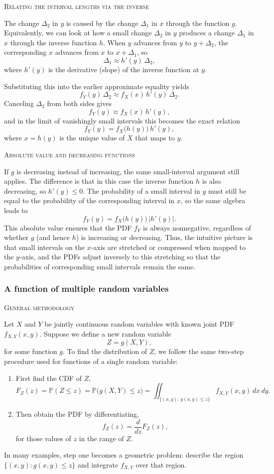 \textsc{Relating the interval lengths via the inverse}

The change \(\Delta_2\) in \(y\) is caused by the change \(\Delta_1\) in \(x\) through the function \(g\).  
Equivalently, we can look at how a small change \(\Delta_2\) in \(y\) produces a change \(\Delta_1\) in \(x\) through the inverse function \(h\).  
When \(y\) advances from \(y\) to \(y + \Delta_2\), the corresponding \(x\) advances from \(x\) to \(x + \Delta_1\), so
\[
\Delta_1
\approx
h'(y)\,\Delta_2,
\]
where \(h'(y)\) is the derivative (slope) of the inverse function at \(y\).  

Substituting this into the earlier approximate equality yields
\[
f_Y(y)\,\Delta_2
\approx
f_X(x)\,h'(y)\,\Delta_2.
\]
Canceling \(\Delta_2\) from both sides gives
\[
f_Y(y)
\approx
f_X(x)\,h'(y),
\]
and in the limit of vanishingly small intervals this becomes the exact relation
\[
f_Y(y)
=
f_X\big(h(y)\big)\,h'(y),
\]
where \(x = h(y)\) is the unique value of \(X\) that maps to \(y\).

\textsc{Absolute value and decreasing functions}

If \(g\) is decreasing instead of increasing, the same small-interval argument still applies.  
The difference is that in this case the inverse function \(h\) is also decreasing, so \(h'(y) \le 0\).  
The probability of a small interval in \(y\) must still be equal to the probability of the corresponding interval in \(x\), so the same algebra leads to
\[
f_Y(y)
=
f_X\big(h(y)\big)\,\big|h'(y)\big|.
\]
This absolute value ensures that the PDF \(f_Y\) is always nonnegative, regardless of whether \(g\) (and hence \(h\)) is increasing or decreasing.  
Thus, the intuitive picture is that small intervals on the \(x\)-axis are stretched or compressed when mapped to the \(y\)-axis, and the PDFs adjust inversely to this stretching so that the probabilities of corresponding small intervals remain the same.



\subsubsection{A function of multiple random variables}

\textsc{General methodology}

Let \(X\) and \(Y\) be jointly continuous random variables with known joint PDF \(f_{X,Y}(x,y)\).  
Suppose we define a new random variable
\[
Z = g(X,Y),
\]
for some function \(g\).  
To find the distribution of \(Z\), we follow the same two-step procedure used for functions of a single random variable:
\begin{enumerate}
\item First find the CDF of \(Z\),
\[
F_Z(z)
=
\mathbb{P}(Z \le z)
=
\mathbb{P}\big(g(X,Y) \le z\big)
=
\iint_{\{(x,y):\, g(x,y)\le z\}} f_{X,Y}(x,y)\,dx\,dy.
\]
\item Then obtain the PDF by differentiating,
\[
f_Z(z)
=
\frac{d}{dz}F_Z(z),
\]
for those values of \(z\) in the range of \(Z\).  
\end{enumerate}
In many examples, step one becomes a geometric problem: describe the region \(\{(x,y) : g(x,y)\le z\}\) and integrate \(f_{X,Y}\) over that region.

